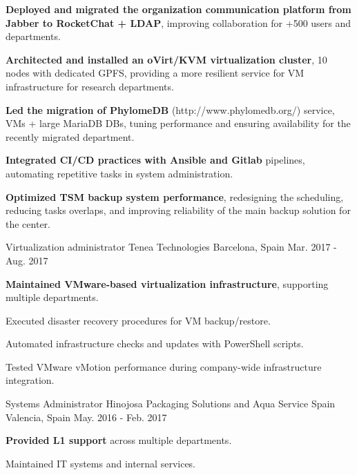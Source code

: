 \begin{cventries}
{\begin{cvitems}
\item{\textbf{Deployed and migrated the organization communication platform from Jabber to RocketChat + LDAP}, improving collaboration for +500 users and departments.}
\item{\textbf{Architected and installed an oVirt/KVM virtualization cluster}, 10 nodes with dedicated GPFS, providing a more resilient service for VM infrastructure for research departments.}
\item{\textbf{Led the migration of PhylomeDB} (http://www.phylomedb.org/) service, VMs + large MariaDB DBs, tuning performance and ensuring availability for the recently migrated department.}
\item{\textbf{Integrated CI/CD practices with Ansible and Gitlab} pipelines, automating repetitive tasks in system administration.}
\item{\textbf{Optimized TSM backup system performance}, redesigning the scheduling, reducing tasks overlaps, and improving reliability of the main backup solution for the center.}
\end{cvitems}
}
\cventry
{Virtualization administrator} %
{Tenea Technologies} %
{Barcelona, Spain} %
{Mar. 2017 - Aug. 2017} %
{ %
\begin{cvitems}
\item{\textbf{Maintained VMware-based virtualization infrastructure}, supporting multiple departments.}
\item{Executed disaster recovery procedures for VM backup/restore.}
\item{Automated infrastructure checks and updates with PowerShell scripts.}
\item{Tested VMware vMotion performance during company-wide infrastructure integration.}
\end{cvitems}
}
\cventry
{Systems Administrator} %
{Hinojosa Packaging Solutions and Aqua Service Spain } %
{Valencia, Spain} %
{May. 2016 - Feb. 2017} %
{ %
\begin{cvitems}
\item{\textbf{Provided L1 support} across multiple departments.}
\item{Maintained IT systems and internal services.}
\end{cvitems}
}
\end{cventries}
